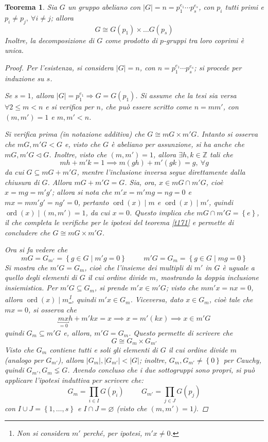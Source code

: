 \documentclass[12pt]{scrartcl}
\theoremstyle{style}
\newtheorem{teorema}{Teorema}[section]
\numberwithin{equation}{subsection}
\begin{document}
\begin{teorema}\label{corts1}
	Sia $G$ un gruppo abeliano con $\lvert G \rvert = n = p_1^{e_1} \cdots p_s^{e_s}$, con $p_i$ tutti primi e $p_i\neq p_j, \ \forall i\neq j$; allora
	\[
	G \cong G(p_1) \times \ldots G(p_s)
	\] 
	Inoltre, la decomposizione di $G$ come prodotto di $p$-gruppi tra loro coprimi \`e unica.
	\begin{proof}
		Per l'esistenza, si considera $\lvert G \rvert =n$, con $n= p_1^{e_1}\cdots p_s^{e_s}$; si procede per induzione su $s$.

		Se $s=1$, allora $\lvert G \rvert =p_1^{e_1}\Rightarrow G=G(p_1)$.
		Si assume che la tesi sia versa $\forall 2\le m<n$ e si verifica per $n$, che pu\`o essere scritto come $n = m m'$, con $(m,m') = 1$ e $m,m' < n$.
		
		Si verifica prima (in notazione additiva) che $G \cong mG \times m' G$.
		Intanto si osserva che $mG,m'G < G$ e, visto che $G$ \`e abeliano per assunzione, si ha anche che $mG,m'G\lhd G$.
		Inoltre, visto che $(m,m') = 1$, allora $\exists h,k \in \mathbb{Z}$ tali che 
		\[
		mh + m'k =1 \implies m(gh) +m'(gk) =g, \ \forall g
		\] 
		da cui $G \subseteq mG + m'G$, mentre l'inclusione inversa segue direttamente dalla chiusura di $G$. 
		Allora $mG + m'G = G$.
		Sia, ora, $x \in mG \cap m'G$, cio\`e $x = mg = m'g'$; allora si nota che $m'x= m'mg = ng = 0$ e $mx=mm'g' = ng' = 0$, pertanto $\operatorname{ord}(x)  \mid m$ e $\operatorname{ord}(x)  \mid m'$, quindi $\operatorname{ord}(x)  \mid (m,m') = 1$, da cui $x=0$.
		Questo implica che $mG\cap m'G = \left\{ e \right\} $, il che completa le verifiche per le ipotesi del teorema \ref{t171} e permette di concludere che $G \cong mG \times m'G$.

		Ora si fa vedere che 
		\[
		mG = G_{m'} = \left\{ g \in G  \mid m'g=0 \right\} \hspace{1cm} m'G = G_m = \left\{ g \in G \mid mg = 0 \right\} 
		\] 
		Si mostra che $m'G = G_m$, cio\`e che l'insieme dei multipli di $m'$ in $G$ \`e uguale a quello degli elementi di $G$ il cui ordine divide $m$, mostrando la doppia inclusione insiemistica.
		Per $m'G \subseteq G_m$, si prende $m'x \in m'G$; visto che $mm'x = n x = 0$, allora $\operatorname{ord}(x)  \mid m$\footnote{Non si considera $m'$ perch\'e, per ipotesi, $m'x\neq 0$.}, quindi $m'x \in G_m$.
		Viceversa, dato $x \in G_m$, cio\`e tale che $mx = 0$, si osserva che
		\[
			\underbracket{mx}_{=0} h + m'kx = x \implies x = m'(kx) \implies x \in  m'G
		\] 
		quindi $G_m \subseteq m'G$ e, allora, $m'G = G_m$.
		Questo permette di scrivere che 
		\[
		G \cong G_m \times G_{m'} 
		\] 
		Visto che $G_m$ contiene tutti e soli gli elementi di $G$ il cui ordine divide $m$ (analogo per $G_{m'} $), allora $\lvert G_m \rvert ,\lvert G_{m'}  \rvert < \lvert G \rvert $; inoltre, $G_{m} , G_{m'} \neq \left\{ 0 \right\} $ per Cauchy, quindi $G_{m'},G_m \lneq G $.
		Avendo concluso che i due sottogruppi sono propri, si pu\`o applicare l'ipotesi induttiva per scrivere che:
		\[
		G_m = \prod _{i\in I} G(p_i) \hspace{1cm}G_{m'} =\prod_{j \in J} G(p_j)
		\] 
		con $I\cup J = \left\{ 1, \ldots, s \right\} $ e $I\cap J = \varnothing$ (visto che $(m,m')=1$).


\end{proof}
\end{teorema}
\end{document}
